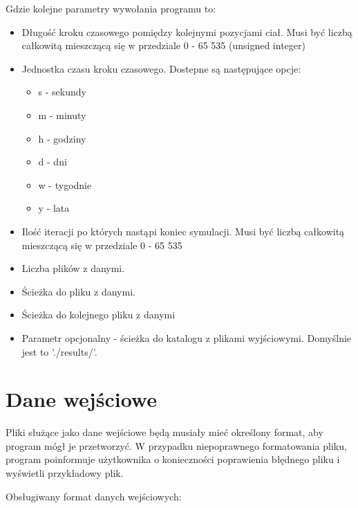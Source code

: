 \documentclass[a4paper,11pt,notitlepage]{article}
\begin{document}
Gdzie kolejne parametry wywołania programu to:
\begin{itemize}[noitemsep]
	\item Długość kroku czasowego pomiędzy kolejnymi pozycjami ciał. Musi być liczbą całkowitą mieszczącą się w przedziale 0 - 65 535 (unsigned integer)
 	\item Jednostka czasu kroku czasowego. Dostepne są następujące opcje:
	\begin{itemize}[noitemsep]
		\item s - sekundy
		\item m - minuty
		\item h - godziny
		\item d - dni
		\item w - tygodnie
		\item y - lata
	\end{itemize}
	\item Ilość iteracji po których nastąpi koniec symulacji. Musi być liczbą całkowitą mieszczącą się w przedziale 0 - 65 535 
	\item Liczba plików z danymi. 
	\item Ścieżka do pliku z danymi.
	\item Ścieżka do kolejnego pliku z danymi
	\item Parametr opcjonalny - ścieżka do katalogu z plikami wyjściowymi. Domyślnie jest to './results/'.
\end{itemize}

\section{Dane wejściowe}
Pliki służące jako dane wejściowe będą musiały mieć określony format, aby program mógł je przetworzyć. W przypadku niepoprawnego formatowania pliku, program poinformuje użytkownika o konieczności poprawienia błędnego pliku i wyświetli przykładowy plik.

\vspace{0.1in}
Obsługiwany format danych wejściowych:

\vspace{0.1in}
\end{document}
